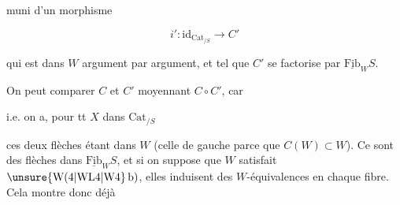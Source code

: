 
muni d'un morphisme

\[
i':\mathrm{id}_{\mathrm{Cat}_{/S}}\longrightarrow C'
\]

qui est dans $W$ argument par argument, et tel que $C'$ se factorise par $\underline{\mathrm{Fib}}_W S$.

On peut comparer $C$ et $C'$ moyennant $C\circ C'$, car


i.e. on a, pour tt $X$ dans $\mathrm{Cat}_{/S}$



ces deux flèches étant dans $W$ (celle de gauche parce que $C(W)\subset W$). Ce sont des flèches dans $\underline{\mathrm{Fib}}_W S$, et si on  suppose que $W$ satisfait $\unsure{\mathrm{W}(4|\mathrm{WL}4|\mathrm{W}4}\,\mathrm b)$, elles induisent des $W$-équivalences en chaque fibre. Cela montre donc déjà
